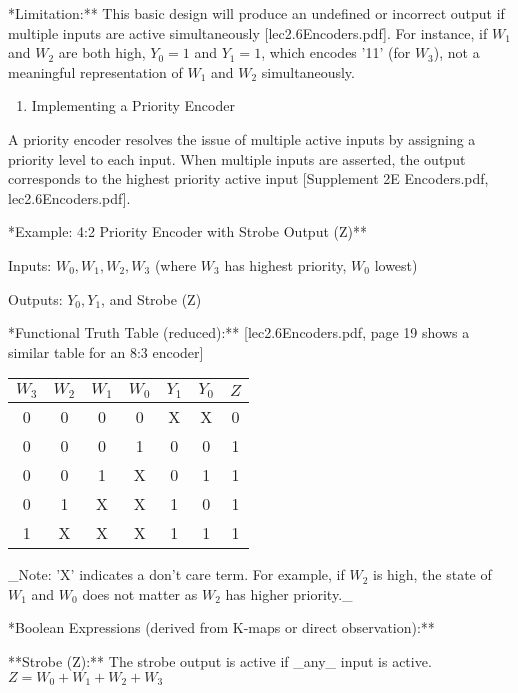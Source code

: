\documentclass{article}
\begin{document}
    \item **Limitation:** This basic design will produce an undefined or incorrect output if multiple inputs are active simultaneously [lec2.6Encoders.pdf]. For instance, if $W_1$ and $W_2$ are both high, $Y_0=1$ and $Y_1=1$, which encodes '11' (for $W_3$), not a meaningful representation of $W_1$ and $W_2$ simultaneously.

\begin{enumerate}
\item Implementing a Priority Encoder

\end{enumerate}
A priority encoder resolves the issue of multiple active inputs by assigning a priority level to each input. When multiple inputs are asserted, the output corresponds to the highest priority active input [Supplement 2E Encoders.pdf, lec2.6Encoders.pdf].

\item **Example: 4:2 Priority Encoder with Strobe Output (Z)**

    \item Inputs: $W_0, W_1, W_2, W_3$ (where $W_3$ has highest priority, $W_0$ lowest)

    \item Outputs: $Y_0, Y_1$, and Strobe (Z)

    \item **Functional Truth Table (reduced):** [lec2.6Encoders.pdf, page 19 shows a similar table for an 8:3 encoder] \begin{tabular}{|cccc|ccc|} \\ \hline $W_3$ & $W_2$ & $W_1$ & $W_0$ & $Y_1$ & $Y_0$ & $Z$ \\ \hline
 0 & 0 & 0 & 0 & X & X & 0 \\ 0 & 0 & 0 & 1 & 0 & 0 & 1 \\ 0 & 0 & 1 & X & 0 & 1 & 1 \\ 0 & 1 & X & X & 1 & 0 & 1 \\ 1 & X & X & X & 1 & 1 & 1 \\ \hline

\end{tabular}
 \_Note: 'X' indicates a don't care term. For example, if $W_2$ is high, the state of $W_1$ and $W_0$ does not matter as $W_2$ has higher priority.\_

    \item **Boolean Expressions (derived from K-maps or direct observation):**

         **Strobe (Z):** The strobe output is active if \_any\_ input is active. $Z = W_0 + W_1 + W_2 + W_3$
\end{document}
